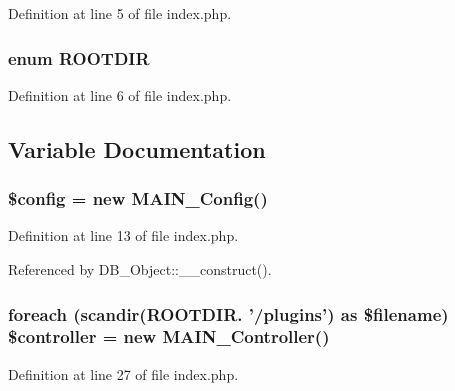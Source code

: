 Definition at line 5 of file index.php.\hypertarget{index_8php_a97c0f936c01d480557c8694b263f3d5e}{
\subsubsection[{ROOTDIR}]{\setlength{\rightskip}{0pt plus 5cm}enum {\bf ROOTDIR}}}
\label{de/d20/index_8php_a97c0f936c01d480557c8694b263f3d5e}


Definition at line 6 of file index.php.

\subsection{Variable Documentation}
\hypertarget{index_8php_a49c7011be9c979d9174c52a8b83e5d8e}{
\subsubsection[{\$config}]{\setlength{\rightskip}{0pt plus 5cm}\$config = new {\bf MAIN\_\-Config}()}}
\label{de/d20/index_8php_a49c7011be9c979d9174c52a8b83e5d8e}


Definition at line 13 of file index.php.

Referenced by DB\_\-Object::\_\-\_\-construct().\hypertarget{index_8php_a75aab33cb166ec47d76ab7d7d2d61450}{
\subsubsection[{\$controller}]{\setlength{\rightskip}{0pt plus 5cm}foreach (scandir(ROOTDIR. '/plugins') as \$filename) \$controller = new {\bf MAIN\_\-Controller}()}}
\label{de/d20/index_8php_a75aab33cb166ec47d76ab7d7d2d61450}


Definition at line 27 of file index.php.